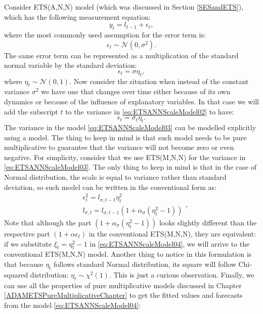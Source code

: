 \documentclass[
]{book}
\theoremstyle{definition}
\theoremstyle{definition}
\theoremstyle{definition}
\theoremstyle{definition}
\theoremstyle{remark}
\begin{document}
Consider ETS(A,N,N) model (which was discussed in Section \ref{SESandETS}), which has the following measurement equation:
\begin{equation}
    y_t = l_{t-1} + \epsilon_t,
    \label{eq:ETSANNScaleModel01}
\end{equation}
where the most commonly used assumption for the error term is:
\begin{equation*}
    \epsilon_t \sim \mathcal{N}(0, \sigma^2) .
\end{equation*}
The same error term can be represented as a multiplication of the standard normal variable by the standard deviation:
\begin{equation}
    \epsilon_t = \sigma \eta_t,
    \label{eq:ETSANNScaleModel02}
\end{equation}
where \(\eta_t \sim \mathcal{N}(0, 1)\). Now consider the situation when instead of the constant variance \(\sigma^2\) we have one that changes over time either because of its own dynamics or because of the influence of explanatory variables. In that case we will add the subscript \(t\) to the variance in \eqref{eq:ETSANNScaleModel02} to have:
\begin{equation}
    \epsilon_t = \sigma_t \eta_t.
    \label{eq:ETSANNScaleModel03}
\end{equation}
The variance in the model \eqref{eq:ETSANNScaleModel03} can be modelled explicitly using a model. The thing to keep in mind is that such model needs to be pure multiplicative to guarantee that the variance will not become zero or even negative. For simplicity, consider that we use ETS(M,N,N) for the variance in \eqref{eq:ETSANNScaleModel03}. The only thing to keep in mind is that in the case of Normal distribution, the scale is equal to variance rather than standard deviation, so such model can be written in the conventional form as:
\begin{equation}
  \begin{aligned}
    &\epsilon_t^2 = l_{\sigma,t-1} \eta_t^2 \\
    &l_{\sigma,t} = l_{\sigma,t-1} \left(1 + \alpha_\sigma (\eta_t^2-1)\right)
  \end{aligned},
  \label{eq:ETSANNScaleModel04}
\end{equation}
Note that although the part \(\left(1 + \alpha_\sigma (\eta_t^2-1)\right)\) looks slightly different than the respective part \(\left(1 + \alpha \epsilon_t \right)\) in the conventional ETS(M,N,N), they are equivalent: if we substitute \(\xi_t = \eta_t^2-1\) in \eqref{eq:ETSANNScaleModel04}, we will arrive to the conventional ETS(M,N,N) model. Another thing to notice in this formulation is that because \(\eta_t\) follows standard Normal distribution, its square will follow Chi-squared distribution: \(\eta_t \sim \chi^2(1)\). This is just a curious observation. Finally, we can use all the properties of pure multiplicative models discussed in Chapter \ref{ADAMETSPureMultiplicativeChapter} to get the fitted values and forecasts from the model \eqref{eq:ETSANNScaleModel04}:
\end{document}
